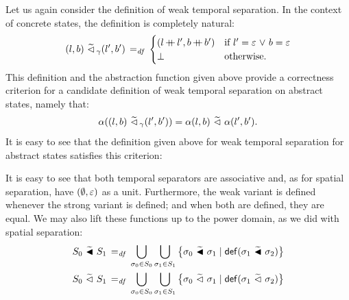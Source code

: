 \documentclass[11pt]{report}
\begin{document}
Let us again consider the definition of weak temporal separation. In the context of concrete states, the definition is completely natural: \[ (l,b) \operatorname{\,\widetilde{\vartriangleleft}\,}_\gamma (l',b') \operatorname{\;=_{\mathit{df}}\;} \begin{cases}
(l \operatorname{+\!\!\!+} l', b \operatorname{+\!\!\!+} b') & \text{if $l' = \varepsilon \operatorname{\,\vee\,} b = \varepsilon$} \\
\bot & \text{otherwise.}
\end{cases} \] This definition and the abstraction function given above provide a correctness criterion for a candidate definition of weak temporal separation on abstract states, namely that: \[ \alpha((l,b) \operatorname{\,\widetilde{\vartriangleleft}\,}_\gamma (l',b')) = \alpha(l,b) \operatorname{\,\widetilde{\vartriangleleft}\,} \alpha(l',b').\] It is easy to see that the definition given above for weak temporal separation for abstract states satisfies this criterion: 

It is easy to see that both temporal separators are associative and, as for spatial separation, have $(\operatorname{\emptyset},\varepsilon)$ as a unit. Furthermore, the weak variant is defined whenever the strong variant is defined; and when both are defined, they are equal. We may also lift these functions up to the power domain, as we did with spatial separation: \begin{align*}
    S_0 \operatorname{\,\widetilde{\blacktriangleleft}\,} S_1 \operatorname{\;=_{\mathit{df}}\;} \bigcup_{\sigma_0 \in S_0} \bigcup_{\sigma_1 \in S_1} \left\lbrace \sigma_0 \operatorname{\,\widetilde{\blacktriangleleft}\,} \sigma_1 \mid \mathsf{def}(\sigma_1 \operatorname{\,\widetilde{\blacktriangleleft}\,} \sigma_2) \right\rbrace \\ 
    S_0 \operatorname{\,\widetilde{\vartriangleleft}\,} S_1 \operatorname{\;=_{\mathit{df}}\;} \bigcup_{\sigma_0 \in S_0} \bigcup_{\sigma_1 \in S_1} \left\lbrace \sigma_0 \operatorname{\,\widetilde{\vartriangleleft}\,} \sigma_1 \mid \mathsf{def}(\sigma_1 \operatorname{\,\widetilde{\vartriangleleft}\,} \sigma_2) \right\rbrace
\end{align*}
\end{document}
